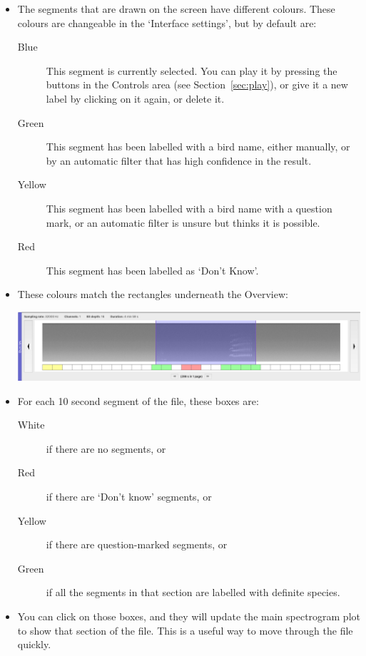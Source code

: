 \documentclass{article}
\begin{document}
\begin{itemize}

\item The segments that are drawn on the screen have different colours. These colours are changeable in the `Interface settings', but by default are:
	\begin{description} 
	\item[Blue] This segment is currently selected. You can play it by pressing the buttons in the Controls area (see Section~\ref{sec:play}), or give it a new label by clicking on it again, or delete it. 
	\item[Green] This segment has been labelled with a bird name, either manually, or by an automatic filter that has high confidence in the result.
	\item[Yellow] This segment has been labelled with a bird name with a question mark, or an automatic filter is unsure but thinks it is possible. 
	\item[Red] This segment has been labelled as `Don't Know'.
	\end{description}

\item These colours match the rectangles underneath the Overview:

\begin{center}
\includegraphics[width=.9\textwidth]{Figures/Overview}
\end{center}

\item For each 10 second segment of the file, these boxes are:
	\begin{description} 
 	\item[White] if there are no segments, or
	\item[Red] if there are `Don't know' segments, or
	\item[Yellow] if there are question-marked segments, or 
	\item[Green] if all the segments in that section are labelled with definite species. 
	\end{description}
	
\item You can click on those boxes, and they will update the main spectrogram plot to show that section of the file. This is a useful way to move through the file quickly.
\end{itemize}
\end{document}
